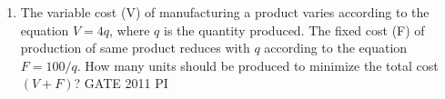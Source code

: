 \documentclass[journal,12pt,onecolumn]{IEEEtran}
\theoremstyle{remark}
\begin{document}
\begin{enumerate}
\item The variable cost (V) of manufacturing a product varies according to the equation $V = 4q$, where $q$ is the quantity produced. The fixed cost (F) of production of same product reduces with $q$ according to the equation $F = 100/q$. How many units should be produced to minimize the total cost $(V+F)$?
\hfill{GATE 2011 PI}
\begin{enumerate}
\end{enumerate}

















    







































    





















































\end{enumerate}
\end{document}
